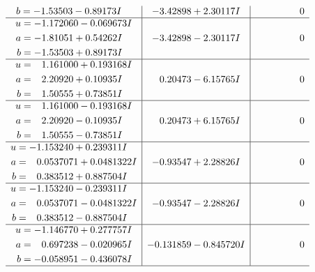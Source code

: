 \documentclass[1p]{elsarticle_modified}
\theoremstyle{definition}
\begin{document}
$$\begin{array}{c|c|c}
\begin{aligned}
b &= -1.53503 - 0.89173 I\end{aligned}
 & -3.42898 + 2.30117 I & \phantom{-0.000000 } 0 \\ \hline\begin{aligned}
u &= -1.172060 - 0.069673 I \\
a &= -1.81051 + 0.54262 I \\
b &= -1.53503 + 0.89173 I\end{aligned}
 & -3.42898 - 2.30117 I & \phantom{-0.000000 } 0 \\ \hline\begin{aligned}
u &= \phantom{-}1.161000 + 0.193168 I \\
a &= \phantom{-}2.20920 + 0.10935 I \\
b &= \phantom{-}1.50555 + 0.73851 I\end{aligned}
 & \phantom{-}0.20473 - 6.15765 I & \phantom{-0.000000 } 0 \\ \hline\begin{aligned}
u &= \phantom{-}1.161000 - 0.193168 I \\
a &= \phantom{-}2.20920 - 0.10935 I \\
b &= \phantom{-}1.50555 - 0.73851 I\end{aligned}
 & \phantom{-}0.20473 + 6.15765 I & \phantom{-0.000000 } 0 \\ \hline\begin{aligned}
u &= -1.153240 + 0.239311 I \\
a &= \phantom{-}0.0537071 + 0.0481322 I \\
b &= \phantom{-}0.383512 + 0.887504 I\end{aligned}
 & -0.93547 + 2.28826 I & \phantom{-0.000000 } 0 \\ \hline\begin{aligned}
u &= -1.153240 - 0.239311 I \\
a &= \phantom{-}0.0537071 - 0.0481322 I \\
b &= \phantom{-}0.383512 - 0.887504 I\end{aligned}
 & -0.93547 - 2.28826 I & \phantom{-0.000000 } 0 \\ \hline\begin{aligned}
u &= -1.146770 + 0.277757 I \\
a &= \phantom{-}0.697238 - 0.020965 I \\
b &= -0.058951 - 0.436078 I\end{aligned}
 & -0.131859 - 0.845720 I & \phantom{-0.000000 } 0\\
 \hline 
 \end{array}$$\newpage$$\begin{array}{c|c|c}  

\end{array}$$
\end{document}
